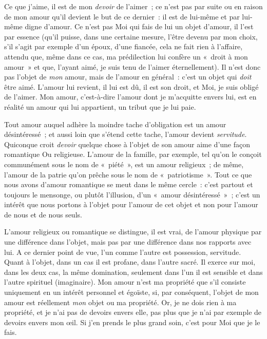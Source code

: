 \documentclass[french,twoside]{book} %
\begin{document}
Ce que j’aime, il est de mon \emph{devoir} de l’aimer ; ce n’est pas par suite ou en raison de mon amour qu’il devient le but de ce dernier : il est de lui-même et par lui-même digne d’amour. Ce n’est pas Moi qui fais de lui un objet d’amour, il l’est par essence (qu’il puisse, dans une certaine mesure, l’être devenu par mon choix, s’il s’agit par exemple d’un époux, d’une fiancée, cela ne fait rien à l’affaire, attendu que, même dans ce cas, ma prédilection lui confère un « droit à mon amour » et que, l’ayant aimé, je suis tenu de l’aimer éternellement). Il n’est donc pas l’objet de \emph{mon} amour, mais de l’amour en général : c’est un objet qui \emph{doit} être aimé. L’amour lui revient, il lui est dû, il est son droit, et Moi, je suis obligé de l’aimer. Mon amour, c’est-à-dire l’amour dont je m’acquitte  envers lui, est en réalité un amour qui lui appartient, un tribut que je lui paie.\par
Tout amour auquel adhère la moindre tache d’obligation est un amour désintéressé ; et aussi loin que s’étend cette tache, l’amour devient \emph{servitude}. Quiconque croit \emph{devoir} quelque chose à l’objet de son amour aime d’une façon romantique Ou religieuse. L’amour de la famille, par exemple, tel qu’on le conçoit communément sous le nom de « piété », est un amour religieux ; de même, l’amour de la patrie qu’on prêche sous le nom de « patriotisme ». Tout ce que nous avons d’amour romantique se meut dans le même cercle : c’est partout et toujours le mensonge, ou plutôt l’illusion, d’un « amour désintéressé » ; c’est un intérêt que nous portons à l’objet pour l’amour de cet objet et non pour l’amour de nous et de nous seuls.\par
L’amour religieux ou romantique se distingue, il est vrai, de l’amour physique par une différence dans l’objet, mais pas par une différence dans nos rapports avec lui. A ce dernier point de vue, l’un comme l’autre est possession, servitude. Quant à l’objet, dans un cas il est profane, dans l’autre sacré. Il exerce sur moi, dans les deux cas, la même domination, seulement dans l’un il est sensible et dans l’autre spirituel (imaginaire). Mon amour n’est ma propriété que s’il consiste uniquement en un intérêt personnel et égoïste, si, par conséquent, l’objet de mon amour est réellement \emph{mon} objet ou ma propriété. Or, je ne dois rien à ma propriété, et je n’ai pas de devoirs envers elle, pas plus que je n’ai par exemple de devoirs envers mon œil. Si j’en prends le plus grand soin, c’est pour Moi que je le fais.\par
\end{document}
